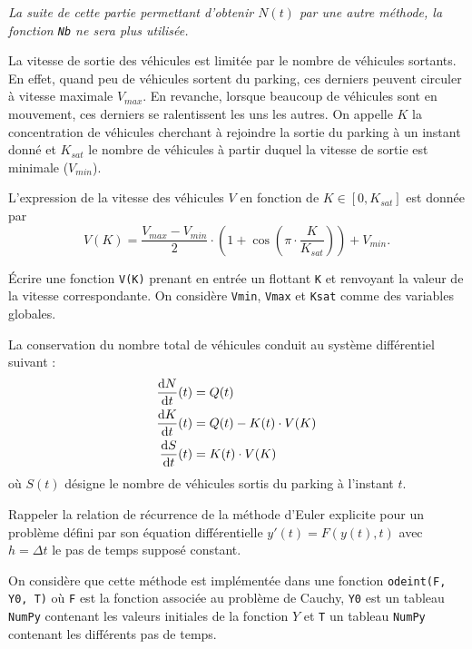\emph{La suite de cette partie permettant d'obtenir $N(t)$ par une autre méthode, la fonction \texttt{Nb} ne sera plus utilisée.}

La vitesse de sortie des véhicules est limitée par le nombre de véhicules sortants. En effet, quand peu de véhicules sortent du parking, ces derniers peuvent circuler à vitesse maximale $V_{max}$. En revanche, lorsque beaucoup de véhicules sont en mouvement, ces derniers se ralentissent les uns les autres. On appelle $K$ la concentration de véhicules cherchant à rejoindre la sortie du parking à un instant donné et $K_{sat}$ le nombre de véhicules à partir duquel la vitesse de sortie est minimale ($V_{min}$).

L'expression de la vitesse des véhicules $V$ en fonction de $K\in[0,K_{sat}]$ est donnée par
\[V(K)=\frac{V_{max}-V_{min}}{2}\cdot\left(1+\cos\left(\pi\cdot\frac{K}{K_{sat}}\right)\right)+V_{min}.\]

\question{} \'Ecrire une fonction \texttt{V(K)} prenant en entrée un flottant \texttt{K} et renvoyant la valeur de la vitesse correspondante. On considère \texttt{Vmin}, \texttt{Vmax} et \texttt{Ksat} comme des variables globales. 


La conservation du nombre total de véhicules conduit au système différentiel suivant :
\begin{align}
\frac{\mathrm{d} N}{\mathrm{d} t}(t)&=Q(t) \label{eq:NbPlusStat}\\
\frac{\mathrm{d} K}{\mathrm{d} t}(t)&= Q(t)-K(t)\cdot V(K)\\\smallskip
\frac{\mathrm{d} S}{\mathrm{d} t}(t)&= K(t)\cdot V(K)\label{eq:Sortis}
\end{align}
où $S(t)$ désigne le nombre de véhicules sortis du parking à l'instant $t$.

\question{} Rappeler la relation de récurrence de la méthode d'Euler explicite pour un problème défini par son équation différentielle $y'(t)=F(y(t), t)$ avec $h=\Delta t$ le pas de temps supposé constant.

On considère que cette méthode est implémentée dans une fonction \texttt{odeint(F, Y0, T)} où \texttt{F} est la fonction associée au problème de Cauchy, \texttt{Y0} est un tableau \texttt{NumPy} contenant les valeurs initiales de la fonction $Y$ et \texttt{T} un tableau \texttt{NumPy} contenant les différents pas de temps.
\medskip

